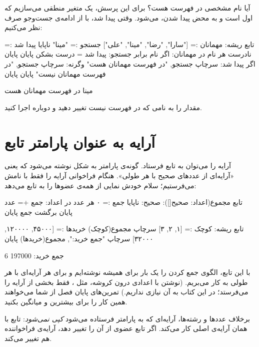 آیا نام مشخصی در فهرست هست؟ برای این پرسش، یک متغیر منطقی می‌سازیم که
اول  است و به محض پیدا شدن،  می‌شود. وقتی پیدا
شد، با  از ادامه‌ی جست‌وجو صرف نظر می‌کنیم:

\begin{salamfa}
تابع ریشه:
    مهمانان := ["سارا", "رضا", "مینا", "علی"]
    جستجو := "مینا"
    ناپایا پیدا شد := نادرست
    هر نام در مهمانان:
        اگر نام برابر جستجو:
            پیدا شد = درست
            بشکن
        پایان
    پایان
    اگر پیدا شد:
        سرچاپ جستجو, "در فهرست مهمانان هست"
    وگرنه:
        سرچاپ جستجو, "در فهرست مهمانان نیست"
    پایان
پایان
\end{salamfa}

\begin{outputfa}
مینا در فهرست مهمانان هست
\end{outputfa}

مقدار  را به نامی که در فهرست نیست تغییر دهید و دوباره اجرا
کنید.

\section{آرایه به عنوان پارامتر تابع}

آرایه را می‌توان به تابع فرستاد. گونه‌ی پارامتر به شکل  نوشته
می‌شود که یعنی «آرایه‌ای از عددهای صحیح با هر طولی». هنگام فراخوانی
آرایه را فقط با نامش می‌فرستیم؛ سلام خودش نمایی از همه‌ی عضوها را
به تابع می‌دهد:

\begin{salamfa}
تابع مجموع(اعداد: صحیح[]): صحیح:
    ناپایا جمع := ۰
    هر عدد در اعداد:
        جمع += عدد
    پایان
    برگشت جمع
پایان

تابع ریشه:
    کوچک := [۱, ۲, ۳]
    سرچاپ مجموع(کوچک)
    خریدها := [۴۵۰۰۰, ۱۲۰۰۰۰, ۳۲۰۰۰]
    سرچاپ "جمع خرید:", مجموع(خریدها)
پایان
\end{salamfa}

\begin{outputfa}
6
جمع خرید: 197000
\end{outputfa}

با این تابع، الگوی جمع کردن را یک بار برای همیشه نوشته‌ایم و برای هر
آرایه‌ای با هر طولی به کار می‌بریم. (نوشتن \code{[:]} با اعدادی درون
کروشه، مثل ، فقط بخشی از آرایه را می‌فرستد؛ در این
کتاب به آن نیازی نداریم.) تمرین‌های پایان فصل از شما می‌خواهند
همین کار را برای بیشترین و میانگین بکنید.

\begin{warn}
برخلاف عددها و رشته‌ها، آرایه‌ای که به پارامتر  فرستاده می‌شود
\emph{کپی نمی‌شود}: تابع با همان آرایه‌ی اصلی کار می‌کند. اگر تابع عضوی از
آن را تغییر دهد، آرایه‌ی فراخواننده هم تغییر می‌کند.
\end{warn}

